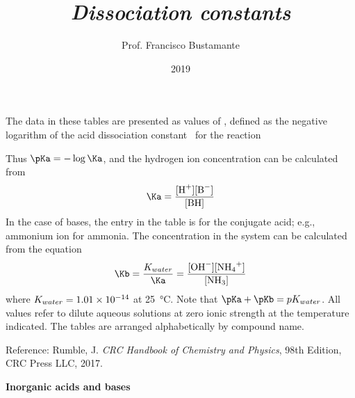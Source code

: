 \documentclass[a4paper, 10pt]{article}
\author{Prof. Francisco Bustamante}
\title{\textit{Dissociation constants}}
\date{2019}
\begin{document}
\small

\twocolumn

The data in these tables are presented as values of \pKa, defined as the negative logarithm of the acid dissociation constant \Ka\, for the reaction 

Thus $\pKa = -\log \Ka$, and the hydrogen ion concentration \ce{[H+]} can be calculated from
\begin{align*}
    \Ka = \frac{\ce{[H^+][B^-]}}{\ce{[BH]}}
\end{align*}
In the case of bases, the entry in the table is for the conjugate acid; e.g., ammonium ion for ammonia. The  concentration in the system  can be calculated from the equation
\begin{align*}
    \Kb = \frac{K_{water}}{\Ka} = \frac{\ce{[OH^-][NH4^+]}}{\ce{[NH3]}}
\end{align*}
where $K_{water} = \num{1.01d-14}$ at \SI{25}{\celsius}. Note that $\pKa + \pKb = pK_{water}$. All values refer to dilute aqueous solutions at zero ionic strength
at the temperature indicated. The tables are arranged alphabetically by compound name.

Reference: Rumble, J. \textit{CRC Handbook of Chemistry and Physics}, 98th Edition, CRC Press LLC, 2017.

\begin{center}
    \begin{large}
        \textbf{Inorganic acids and bases}
    \end{large}
\end{center}

\end{document}
